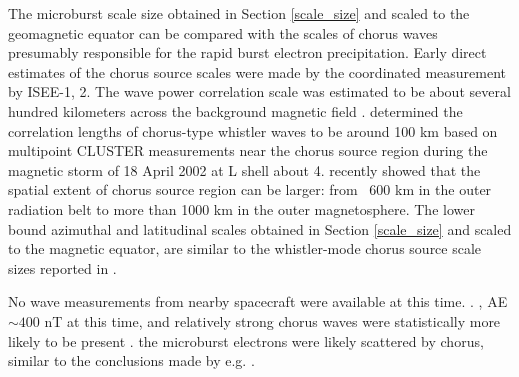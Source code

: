 \documentclass[draft, linenumbers]{agujournal}
\begin{document}
The microburst scale size obtained in Section \ref{scale_size} and scaled to the geomagnetic equator can be compared with the scales of chorus waves presumably responsible for the rapid burst electron precipitation. Early direct estimates of the chorus source scales were made by the coordinated measurement by ISEE-1, 2. The wave power correlation scale was estimated to be about several hundred kilometers across the background magnetic field \citep{Gurnett1979}. \citet{Santolik2003} determined the correlation lengths of chorus-type whistler waves to be around 100 km based on multipoint CLUSTER  measurements near the chorus source region during the magnetic storm of 18 April 2002 at L shell about 4. \citet{Agapitov2010, Agapitov2011b, Agapitov2017a} recently showed that the spatial extent of chorus source region can be larger: from ~600 km in the outer radiation belt to more than 1000 km in the outer magnetosphere. The lower bound azimuthal and latitudinal scales obtained in Section \ref{scale_size} and scaled to the magnetic equator, are similar to the whistler-mode chorus source scale sizes reported in \citet{Agapitov2011b, Agapitov2017a}. 

No wave measurements from nearby spacecraft were available at this time.  . , AE $\sim 400$ nT at this time, and relatively strong chorus waves were statistically more likely to be present  \citep{Li2009}.  the microburst electrons were likely scattered by chorus, similar to the conclusions made by e.g. \citet{Lorentzen2001a, O'Brien2003, Breneman2017}.

\end{document}

